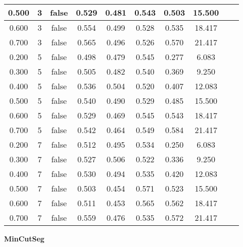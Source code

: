\documentclass{article}
\begin{document}
\begin{longtable}[c]{|c|c|c|c|c|c|c|c|c|c|}
 0.500 & 3 & false & 0.529 & 0.481 & 0.543 & 0.503 & 15.500  \\ \hline 
 0.600 & 3 & false & 0.554 & 0.499 & 0.528 & 0.535 & 18.417  \\ \hline 
 0.700 & 3 & false & 0.565 & 0.496 & 0.526 & 0.570 & 21.417  \\ \hline 
 0.200 & 5 & false & 0.498 & 0.479 & 0.545 & 0.277 & 6.083  \\ \hline 
 0.300 & 5 & false & 0.505 & 0.482 & 0.540 & 0.369 & 9.250  \\ \hline 
 0.400 & 5 & false & 0.536 & 0.504 & 0.520 & 0.407 & 12.083  \\ \hline 
 0.500 & 5 & false & 0.540 & 0.490 & 0.529 & 0.485 & 15.500  \\ \hline 
 0.600 & 5 & false & 0.529 & 0.469 & 0.545 & 0.543 & 18.417  \\ \hline 
 0.700 & 5 & false & 0.542 & 0.464 & 0.549 & 0.584 & 21.417  \\ \hline 
 0.200 & 7 & false & 0.512 & 0.495 & 0.534 & 0.250 & 6.083  \\ \hline 
 0.300 & 7 & false & 0.527 & 0.506 & 0.522 & 0.336 & 9.250  \\ \hline 
 0.400 & 7 & false & 0.530 & 0.494 & 0.535 & 0.420 & 12.083  \\ \hline 
 0.500 & 7 & false & 0.503 & 0.454 & 0.571 & 0.523 & 15.500  \\ \hline 
 0.600 & 7 & false & 0.511 & 0.453 & 0.565 & 0.562 & 18.417  \\ \hline 
 0.700 & 7 & false & 0.559 & 0.476 & 0.535 & 0.572 & 21.417  \\ \hline 
 \end{longtable} 

\newpage

{  
\large
\center
	\textbf{MinCutSeg}  

}
\end{document}
